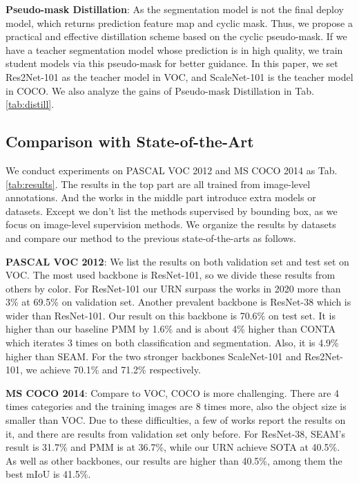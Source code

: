 \noindent \textbf{Pseudo-mask Distillation}: As the segmentation model  is not the final deploy model, which returns prediction feature map and cyclic mask. Thus, we propose a practical and effective distillation scheme based on the cyclic pseudo-mask. If we have a teacher segmentation model  whose prediction  is in high quality, we train student models via this pseudo-mask for better guidance. In this paper, we set Res2Net-101 as the teacher model in VOC, and ScaleNet-101 is the teacher model in COCO. We also analyze the gains of Pseudo-mask Distillation in Tab.\ref{tab:distill}.



\subsection{Comparison with State-of-the-Art}
We conduct experiments on PASCAL VOC 2012 and MS COCO 2014 as Tab.\ref{tab:results}. The results in the top part are all trained from image-level annotations. And the works in the middle part introduce extra models or datasets. Except \cite{Khoreva_2017_CVPR} we don't list the methods supervised by bounding box, as we focus on image-level supervision methods. We organize the results by datasets and compare our method to the previous state-of-the-arts as follows.

\noindent \textbf{PASCAL VOC 2012}: We list the results on both validation set and test set on VOC. The most used backbone is ResNet-101, so we divide these results from others by color. For ResNet-101 our URN surpass the works in 2020 more than 3\% at 69.5\% on validation set. Another prevalent backbone is ResNet-38 which is wider than ResNet-101. Our result on this backbone is 70.6\% on test set. It is higher than our baseline PMM by 1.6\% and is about 4\% higher than CONTA which iterates 3 times on both classification and segmentation. Also, it is 4.9\% higher than SEAM. For the two stronger backbones ScaleNet-101 and Res2Net-101, we achieve 70.1\% and 71.2\% respectively.

\noindent \textbf{MS COCO 2014}: Compare to VOC, COCO is more challenging. There are 4 times categories and the training images are 8 times more, also the object size is smaller than VOC. Due to these difficulties, a few of works report the results on it, and there are results from validation set only before. For ResNet-38, SEAM's result is 31.7\% and PMM is at 36.7\%, while our URN achieve SOTA at 40.5\%. As well as other backbones, our results are higher than 40.5\%, among them the best mIoU is 41.5\%.

